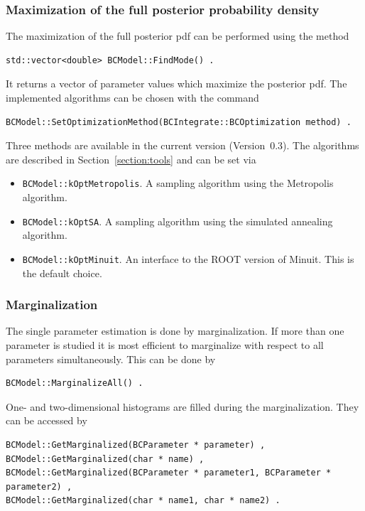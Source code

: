 \documentclass[11pt, a4paper]{article}
\newcommand{\versionno}{0.3}
\newcommand{\Version}{Version~\versionno}
\begin{document}

\subsubsection{Maximization of the full posterior probability density} 

The maximization of the full posterior pdf can be performed using the
method
%
\begin{verbatim} 
std::vector<double> BCModel::FindMode() . 
\end{verbatim} 

\noindent 
It returns a vector of parameter values which maximize the posterior
pdf. The implemented algorithms can be chosen with the command
%
\begin{verbatim}
BCModel::SetOptimizationMethod(BCIntegrate::BCOptimization method) .
\end{verbatim}
%
Three methods are available in the current version (\Version). The
algorithms are described in Section~\ref{section:tools} and can be set
via
%
\begin{itemize}
\item \verb|BCModel::kOptMetropolis|. A sampling algorithm using the
  Metropolis algorithm.
\item \verb|BCModel::kOptSA|. A sampling algorithm using the
  simulated annealing algorithm.
\item \verb|BCModel::kOptMinuit|. An interface to the ROOT version of Minuit. 
This is the default choice.
\end{itemize}


\subsubsection{Marginalization} 

\noindent 
The single parameter estimation is done by marginalization. If more
than one parameter is studied it is most efficient to marginalize with
respect to all parameters simultaneously. This can be done by
%
\begin{verbatim}
BCModel::MarginalizeAll() . 
\end{verbatim} 

\noindent 
One- and two-dimensional histograms are filled during the
marginalization. They can be accessed by
%
\begin{verbatim}
BCModel::GetMarginalized(BCParameter * parameter) ,
BCModel::GetMarginalized(char * name) ,
BCModel::GetMarginalized(BCParameter * parameter1, BCParameter * parameter2) ,
BCModel::GetMarginalized(char * name1, char * name2) .
\end{verbatim}
\end{document}
